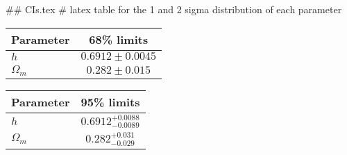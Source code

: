 ## CIs.tex
# latex table for the 1 and 2 sigma distribution of each parameter

\begin{tabular} { l  c}
 Parameter &  68\% limits\\
\hline
{\boldmath$h              $} & $0.6912\pm 0.0045          $\\
{\boldmath$\Omega_m       $} & $0.282\pm 0.015            $\\
\hline
\end{tabular}

\begin{tabular} { l  c}
 Parameter &  95\% limits\\
\hline
{\boldmath$h              $} & $0.6912^{+0.0088}_{-0.0089}$\\
{\boldmath$\Omega_m       $} & $0.282^{+0.031}_{-0.029}   $\\
\hline
\end{tabular}
